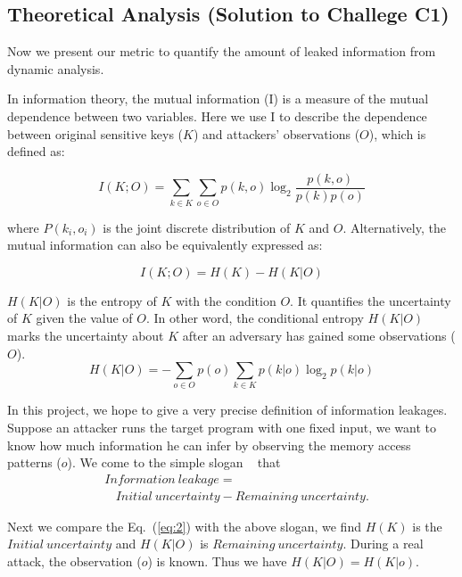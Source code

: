 \subsection{Theoretical Analysis \textbf{(Solution to Challege C1)}}
Now we present our metric to quantify the amount of leaked information from
dynamic analysis.

In information theory, the mutual information (I) is a measure of the mutual
dependence between two variables. Here we use I to describe the
dependence between original sensitive keys ($K$) and attackers' observations ($O$), 
which is defined as:

\begin{equation} \label{eq:1}
    I(K;O) = \sum_{k {\in} K}{\sum_{o {\in} O}{p(k, o)\log_2\frac{p(k, o)}{p(k)p(o)}}}
\end{equation}

where $P(k_i, o_i)$ is the joint discrete distribution of $K$ and $O$.
Alternatively, the mutual information can also be equivalently expressed as:

\begin{equation} \label{eq:2}
    I(K;O) = H(K) - H(K|O)
\end{equation}

$H(K|O)$ is the entropy of $K$ with the condition $O$. It quantifies the
uncertainty of $K$ given the value of $O$. In other word, the conditional
entropy $H(K|O)$ marks the uncertainty about $K$ after an adversary has gained
some observations ($O$).
\begin{equation}
    H(K|O) = - \sum_{o {\in} O} {p(o) \sum_{k {\in} K}{p(k|o)\log_2p(k|o)}}
\end{equation}

In this project, we hope to give a very precise definition of information
leakages. Suppose an attacker runs the target program with one
fixed input, we want to know how much information he can infer by observing the
memory access patterns ($o$). We come to the simple slogan
~\cite{10.1007/978-3-642-00596-1_21} %
that
\begin{align*}
     & \mathit{Information\ leakage} =                                         \\
     & ~~~~ \mathit{Initial\ uncertainty} - \mathit{Remaining\ uncertainty}.
\end{align*}

Next we compare the Eq.~(\ref{eq:2}) with the above slogan, we find $H(K)$
is the $\mathit{Initial\ uncertainty}$ and $H(K|O)$ is $\mathit{Remaining\
uncertainty}$. During a real attack, the observation ($o$) is known.  Thus we
have $H(K|O) = H(K|o)$.

